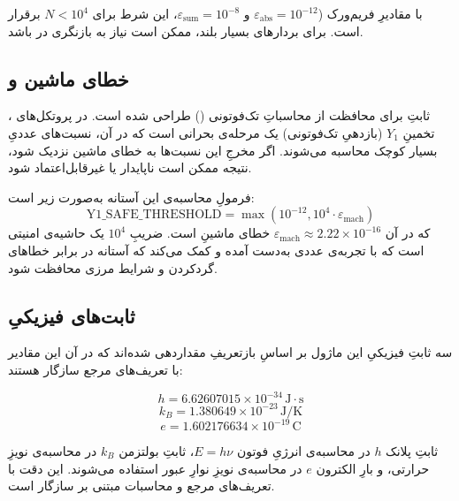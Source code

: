 با مقادیرِ فریم‌ورک ($\varepsilon_{\text{abs}} = 10^{-12}$ و $\varepsilon_{\text{sum}} = 10^{-8}$، این شرط برای $N < 10^4$ برقرار است. برای بردارهای بسیار بلند، ممکن است نیاز به بازنگری در  باشد.

\subsection{خطای ماشین و }

ثابتِ  برای محافظت از محاسباتِ تک‌فوتونی () طراحی شده است. در پروتکل‌های ، تخمینِ $Y_1$ (بازدهیِ تک‌فوتونی) یک مرحله‌ی بحرانی است که در آن، نسبت‌های عددیِ بسیار کوچک محاسبه می‌شوند. اگر مخرجِ این نسبت‌ها به خطای ماشین نزدیک شود، نتیجه ممکن است ناپایدار یا غیرقابل‌اعتماد شود.

فرمولِ محاسبه‌ی این آستانه به‌صورت زیر است:
\begin{equation}
	\text{Y1\_SAFE\_THRESHOLD} = \max(10^{-12}, 10^4 \cdot \varepsilon_{\text{mach}})
\end{equation}
که در آن $\varepsilon_{\text{mach}} \approx 2.22 \times 10^{-16}$ خطای ماشینِ  است. ضریبِ $10^4$ یک حاشیه‌ی امنیتی است که با تجربه‌ی عددی به‌دست آمده و کمک می‌کند که آستانه در برابر خطاهای گردکردن و شرایط مرزی محافظت شود.

\subsection{ثابت‌های فیزیکیِ }

سه ثابتِ فیزیکیِ این ماژول بر اساسِ بازتعریفِ  مقداردهی شده‌اند که در آن این مقادیر با تعریف‌های مرجع  سازگار هستند:

\begin{equation}
	h = 6.62607015 \times 10^{-34} \, \text{J}\cdot\text{s}
\end{equation}
\begin{equation}
	k_B = 1.380649 \times 10^{-23} \, \text{J/K}
\end{equation}
\begin{equation}
	e = 1.602176634 \times 10^{-19} \, \text{C}
\end{equation}

ثابتِ پلانک $h$ در محاسبه‌ی انرژیِ فوتون $E = h\nu$، ثابتِ بولتزمن $k_B$ در محاسبه‌ی نویزِ حرارتی، و بارِ الکترون $e$ در محاسبه‌ی نویزِ نوارِ عبور  استفاده می‌شوند. این دقت با تعریف‌های مرجع و محاسبات مبتنی بر  سازگار است.

